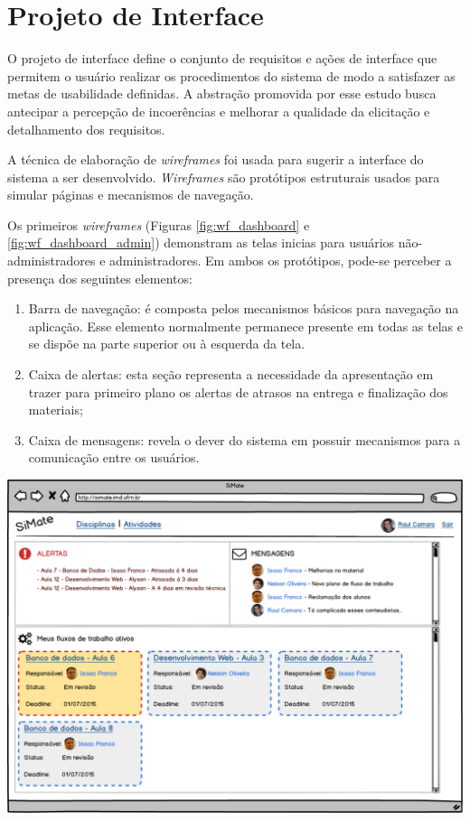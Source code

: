 \section{Projeto de Interface}

O projeto de interface define o conjunto de requisitos e ações de interface que permitem o usuário realizar os procedimentos do sistema de modo a satisfazer as metas de usabilidade definidas. A abstração promovida por esse estudo busca antecipar a percepção de incoerências e melhorar a qualidade da elicitação e detalhamento dos requisitos.

A técnica de elaboração de \textit{wireframes} foi usada para sugerir a interface do sistema a ser desenvolvido. \textit{Wireframes} são protótipos estruturais usados para simular páginas e mecanismos de navegação.

Os primeiros \textit{wireframes} (Figuras \hyperref[fig:wf_dashboard]{\ref{fig:wf_dashboard}} e \hyperref[fig:wf_dashboard_admin]{\ref{fig:wf_dashboard_admin}}) demonstram as telas inicias para usuários não-administradores e administradores. Em ambos os protótipos, pode-se perceber a presença dos seguintes elementos:

\begin{enumerate}  
\item Barra de navegação: é composta pelos mecanismos básicos para navegação na aplicação. Esse elemento normalmente permanece presente em todas as telas e se dispõe na parte superior ou à esquerda da tela.
\item Caixa de alertas: esta seção representa a necessidade da apresentação em trazer para primeiro plano os alertas de atrasos na entrega e finalização dos materiais;
\item Caixa de mensagens: revela o dever do sistema em possuir mecanismos para a comunicação entre os usuários.
\end{enumerate}

\vspace{5mm}
\begin{minipage}[c]{\textwidth}
    \includegraphics[width=15cm]{Wireframes/Dashboard.png}
	\label{fig:wf_dashboard}
\end{minipage} \\

